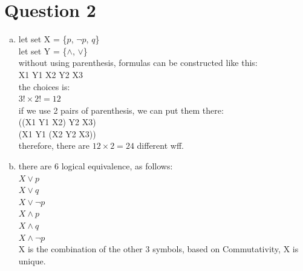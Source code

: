 \documentclass[11pt, a4paper]{article}
\begin{document}
\section*{Question 2}
\begin{enumerate}[(a)]
    \item
        let set X = \{$p$, $\neg p$, $q$\}\\
        let set Y = \{$\land$, $\lor$\}\\
        without using parenthesis, formulas can be constructed like this:\\
        X1 Y1 X2 Y2 X3\\
        the choices is:\\
        $3! \times 2! = 12$\\
        if we use 2 pairs of parenthesis, we can put them there:\\
        ((X1 Y1 X2) Y2 X3)\\
        (X1 Y1 (X2 Y2 X3))\\
        therefore, there are $12 \times 2 = 24$ different wff.
    \item
        there are 6 logical equivalence, as follows:\\
        $X \lor p$\\
        $X \lor q$\\
        $X \lor \neg p$\\
        $X \land p$\\
        $X \land q$\\
        $X \land \neg p$\\
        X is the combination of the other 3 symbols, based on Commutativity, X is unique.

    \end{enumerate}
\end{document}
